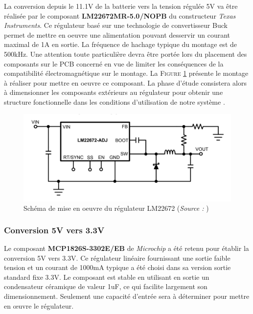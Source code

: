 \documentclass[a4paper,12pt]{report}
\begin{document}
			La conversion depuis le 11.1V de la batterie vers la tension régulée 5V va être réalisée par le composant \textbf{LM22672MR-5.0/NOPB} du constructeur \textit{Texas Instruments}. Ce régulateur basé sur une technologie de convertisseur Buck permet de mettre en oeuvre une alimentation pouvant desservir un courant maximal de 1A en sortie. La fréquence de hachage typique du montage est de 500kHz. Une attention toute particulière devra être portée lors du placement des composants sur le PCB concerné en vue de limiter les conséquences de la compatibilité électromagnétique sur le montage. La \textsc{Figure \ref{buck_gen_scheme}} présente le montage à réaliser pour mettre en oeuvre ce composant. La phase d'étude consistera alors à dimensionner les composants extérieurs au régulateur pour obtenir une structure fonctionnelle dans les conditions d'utilisation de notre système \cite{LM22672}.
			
			\begin{figure}[h]
				 	\begin{center}
				 		\includegraphics[scale=0.45]{../Illus/buck_gen_scheme.png}
				 	\end{center}
				 	\caption{Schéma de mise en oeuvre du régulateur LM22672 (\textit{Source :} \cite{LM22672})}
				 	\label{buck_gen_scheme}
				 \end{figure}	
			
			\vspace{-1em}
			
			\subsubsection{Conversion 5V vers 3.3V}
			
			\vspace{-1em}
			
			Le composant \textbf{MCP1826S-3302E/EB} de \textit{Microchip} a été retenu pour établir la conversion 5V vers 3.3V. Ce régulateur linéaire fournissant une sortie faible tension et un courant de 1000mA typique a été choisi dans sa version sortie standard fixe 3.3V. Le composant est stable en utilisant en sortie un condensateur céramique de valeur 1uF, ce qui facilite largement son dimensionnement. Seulement une capacité d'entrée sera à déterminer pour mettre en œuvre le régulateur.
			
\end{document}
